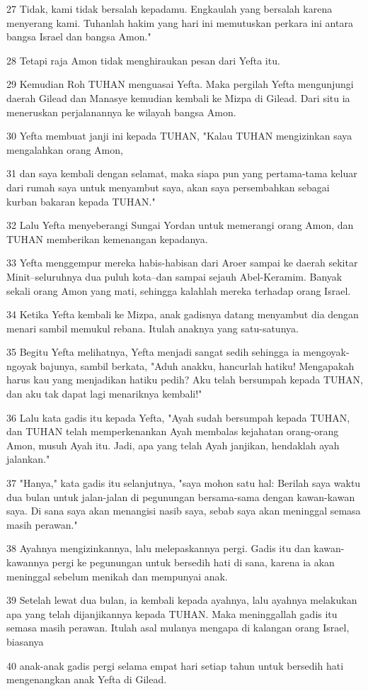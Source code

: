\par 27 Tidak, kami tidak bersalah kepadamu. Engkaulah yang bersalah karena menyerang kami. Tuhanlah hakim yang hari ini memutuskan perkara ini antara bangsa Israel dan bangsa Amon."
\par 28 Tetapi raja Amon tidak menghiraukan pesan dari Yefta itu.
\par 29 Kemudian Roh TUHAN menguasai Yefta. Maka pergilah Yefta mengunjungi daerah Gilead dan Manasye kemudian kembali ke Mizpa di Gilead. Dari situ ia meneruskan perjalanannya ke wilayah bangsa Amon.
\par 30 Yefta membuat janji ini kepada TUHAN, "Kalau TUHAN mengizinkan saya mengalahkan orang Amon,
\par 31 dan saya kembali dengan selamat, maka siapa pun yang pertama-tama keluar dari rumah saya untuk menyambut saya, akan saya persembahkan sebagai kurban bakaran kepada TUHAN."
\par 32 Lalu Yefta menyeberangi Sungai Yordan untuk memerangi orang Amon, dan TUHAN memberikan kemenangan kepadanya.
\par 33 Yefta menggempur mereka habis-habisan dari Aroer sampai ke daerah sekitar Minit--seluruhnya dua puluh kota--dan sampai sejauh Abel-Keramim. Banyak sekali orang Amon yang mati, sehingga kalahlah mereka terhadap orang Israel.
\par 34 Ketika Yefta kembali ke Mizpa, anak gadisnya datang menyambut dia dengan menari sambil memukul rebana. Itulah anaknya yang satu-satunya.
\par 35 Begitu Yefta melihatnya, Yefta menjadi sangat sedih sehingga ia mengoyak-ngoyak bajunya, sambil berkata, "Aduh anakku, hancurlah hatiku! Mengapakah harus kau yang menjadikan hatiku pedih? Aku telah bersumpah kepada TUHAN, dan aku tak dapat lagi menariknya kembali!"
\par 36 Lalu kata gadis itu kepada Yefta, "Ayah sudah bersumpah kepada TUHAN, dan TUHAN telah memperkenankan Ayah membalas kejahatan orang-orang Amon, musuh Ayah itu. Jadi, apa yang telah Ayah janjikan, hendaklah ayah jalankan."
\par 37 "Hanya," kata gadis itu selanjutnya, "saya mohon satu hal: Berilah saya waktu dua bulan untuk jalan-jalan di pegunungan bersama-sama dengan kawan-kawan saya. Di sana saya akan menangisi nasib saya, sebab saya akan meninggal semasa masih perawan."
\par 38 Ayahnya mengizinkannya, lalu melepaskannya pergi. Gadis itu dan kawan-kawannya pergi ke pegunungan untuk bersedih hati di sana, karena ia akan meninggal sebelum menikah dan mempunyai anak.
\par 39 Setelah lewat dua bulan, ia kembali kepada ayahnya, lalu ayahnya melakukan apa yang telah dijanjikannya kepada TUHAN. Maka meninggallah gadis itu semasa masih perawan. Itulah asal mulanya mengapa di kalangan orang Israel, biasanya
\par 40 anak-anak gadis pergi selama empat hari setiap tahun untuk bersedih hati mengenangkan anak Yefta di Gilead.

